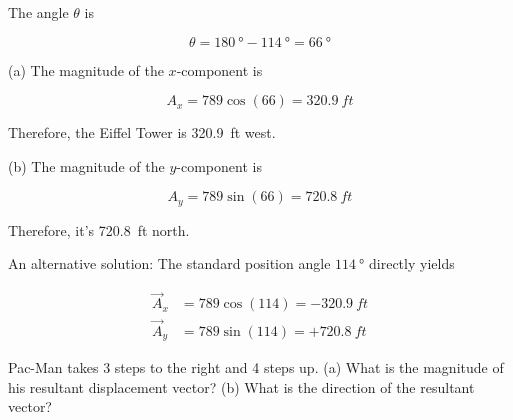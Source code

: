 \documentclass[main-physics.tex]{subfiles}
\begin{document}
\Solution

\begin{figure}[h!]
    \centering
{}
\end{figure}

The angle $\theta$ is

\begin{equation*}
    \theta = \SI{180}{\degree} - \SI{114}{\degree} = \SI{66}{\degree}
\end{equation*}

(a) The magnitude of the $x$-component is 

\begin{equation*}
    A_x = 789 \cos{(66)} = \SI{320.9}{ft}
\end{equation*}

Therefore, the Eiffel Tower is \SI{320.9}{ft} west.

(b) The magnitude of the $y$-component is

\begin{equation*}
    A_y = 789 \sin{(66)} = \SI{720.8}{ft}
\end{equation*}

Therefore, it's \SI{720.8}{ft} north.

An alternative solution: The standard position angle $\SI{114}{\degree}$ directly yields 

\begin{align*}
    \vec{A}_x &= 789 \cos{(114)} = -\SI{320.9}{ft}\\[1ex]
    \vec{A}_y &= 789 \sin{(114)} = +\SI{720.8}{ft}
\end{align*}

\begin{example}
    Pac-Man takes 3 steps to the right and 4 steps up. (a) What is the magnitude of his resultant displacement vector? (b) What is the direction of the resultant vector?
\end{example}
\end{document}
